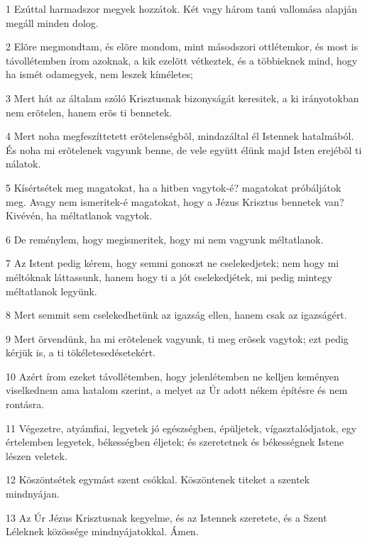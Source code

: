 \par 1 Ezúttal harmadszor megyek hozzátok. Két vagy három tanú vallomása alapján megáll minden dolog.
\par 2 Elõre megmondtam, és elõre mondom, mint másodszori ottlétemkor, és most is távollétemben írom azoknak, a kik ezelõtt vétkeztek, és a többieknek mind, hogy ha ismét odamegyek, nem leszek kíméletes;
\par 3 Mert hát az általam szóló Krisztusnak bizonyságát keresitek, a ki irányotokban nem erõtelen, hanem erõs ti bennetek.
\par 4 Mert noha megfeszíttetett erõtelenségbõl, mindazáltal  él Istennek hatalmából. És noha mi erõtelenek vagyunk benne, de vele együtt élünk majd Isten erejébõl ti nálatok.
\par 5 Kísértsétek meg magatokat, ha a hitben vagytok-é? magatokat próbáljátok meg. Avagy nem ismeritek-é magatokat, hogy a Jézus  Krisztus bennetek van? Kivévén, ha méltatlanok vagytok.
\par 6 De reménylem, hogy megismeritek, hogy mi nem vagyunk méltatlanok.
\par 7 Az Istent pedig kérem, hogy semmi gonoszt ne cselekedjetek; nem hogy mi méltóknak láttassunk, hanem hogy ti a jót cselekedjétek, mi pedig mintegy méltatlanok legyünk.
\par 8 Mert semmit sem cselekedhetünk az igazság ellen, hanem csak az igazságért.
\par 9 Mert örvendünk, ha mi erõtelenek vagyunk, ti meg erõsek vagytok; ezt pedig kérjük is, a ti tökéletesedésetekért.
\par 10 Azért írom ezeket távollétemben, hogy jelenlétemben ne kelljen keményen viselkednem ama hatalom szerint,  a melyet az Úr adott nékem építésre és nem rontásra.
\par 11 Végezetre, atyámfiai, legyetek jó egészségben, épüljetek, vígasztalódjatok, egy értelemben legyetek, békességben  éljetek; és szeretetnek és békességnek Istene lészen veletek.
\par 12 Köszöntsétek egymást szent csókkal. Köszöntenek titeket a szentek mindnyájan.
\par 13 Az Úr Jézus Krisztusnak kegyelme, és az Istennek szeretete, és a Szent Léleknek közössége mindnyájatokkal. Ámen.


